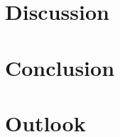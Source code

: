 \section{Discussion}\label{sec:discussion}

\newpage
\section{Conclusion}\label{sec:conclusion}

\newpage
\section{Outlook}\label{sec:outlook}
